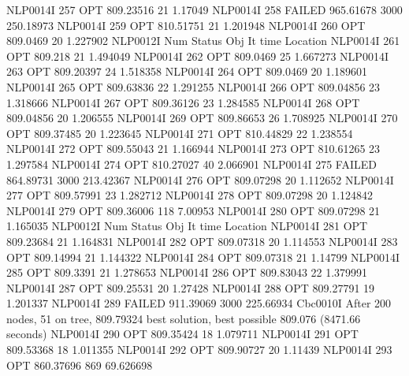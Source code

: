 NLP0014I           257         OPT 809.23516       21 1.17049
NLP0014I           258      FAILED 965.61678     3000 250.18973
NLP0014I           259         OPT 810.51751       21 1.201948
NLP0014I           260         OPT 809.0469       20 1.227902
NLP0012I 
              Num      Status      Obj             It       time                 Location
NLP0014I           261         OPT 809.218       21 1.494049
NLP0014I           262         OPT 809.0469       25 1.667273
NLP0014I           263         OPT 809.20397       24 1.518358
NLP0014I           264         OPT 809.0469       20 1.189601
NLP0014I           265         OPT 809.63836       22 1.291255
NLP0014I           266         OPT 809.04856       23 1.318666
NLP0014I           267         OPT 809.36126       23 1.284585
NLP0014I           268         OPT 809.04856       20 1.206555
NLP0014I           269         OPT 809.86653       26 1.708925
NLP0014I           270         OPT 809.37485       20 1.223645
NLP0014I           271         OPT 810.44829       22 1.238554
NLP0014I           272         OPT 809.55043       21 1.166944
NLP0014I           273         OPT 810.61265       23 1.297584
NLP0014I           274         OPT 810.27027       40 2.066901
NLP0014I           275      FAILED 864.89731     3000 213.42367
NLP0014I           276         OPT 809.07298       20 1.112652
NLP0014I           277         OPT 809.57991       23 1.282712
NLP0014I           278         OPT 809.07298       20 1.124842
NLP0014I           279         OPT 809.36006      118 7.00953
NLP0014I           280         OPT 809.07298       21 1.165035
NLP0012I 
              Num      Status      Obj             It       time                 Location
NLP0014I           281         OPT 809.23684       21 1.164831
NLP0014I           282         OPT 809.07318       20 1.114553
NLP0014I           283         OPT 809.14994       21 1.144322
NLP0014I           284         OPT 809.07318       21 1.14799
NLP0014I           285         OPT 809.3391       21 1.278653
NLP0014I           286         OPT 809.83043       22 1.379991
NLP0014I           287         OPT 809.25531       20 1.27428
NLP0014I           288         OPT 809.27791       19 1.201337
NLP0014I           289      FAILED 911.39069     3000 225.66934
Cbc0010I After 200 nodes, 51 on tree, 809.79324 best solution, best possible 809.076 (8471.66 seconds)
NLP0014I           290         OPT 809.35424       18 1.079711
NLP0014I           291         OPT 809.53368       18 1.011355
NLP0014I           292         OPT 809.90727       20 1.11439
NLP0014I           293         OPT 860.37696      869 69.626698
